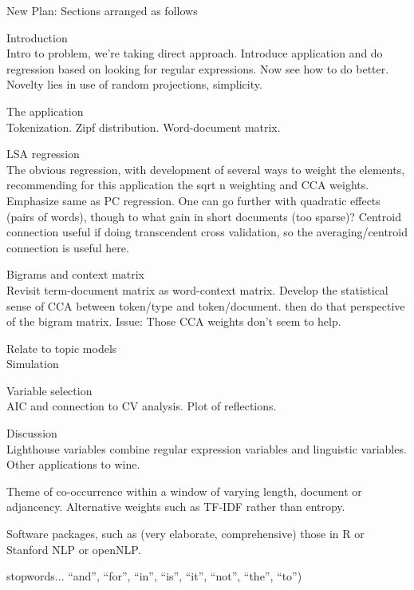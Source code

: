 \documentclass[12pt]{article}
\begin{document}
New Plan:
Sections arranged as follows
\begin{description}
\item{Introduction}  \\  
Intro to problem, we're taking direct approach.  Introduce application and do regression based on looking for   regular expressions.  Now see how to do better.  Novelty lies in use of random projections, simplicity.
\item{ The application } \\ Tokenization.  Zipf distribution.  Word-document matrix. 
\item{LSA regression}  \\ 
The obvious regression, with development of several ways to weight the elements, recommending for this application the sqrt n weighting and CCA weights.  Emphasize same as PC regression.  One can go further with quadratic effects (pairs of words), though to what gain in short documents (too sparse)?  Centroid connection useful if doing transcendent cross validation, so the averaging/centroid connection is useful here.
\item{Bigrams and context matrix} \\ 
Revisit term-document matrix as word-context matrix.  Develop the statistical sense of CCA between token/type and token/document.  then do that perspective of the bigram matrix.  Issue:  Those CCA weights don't seem to help.
\item{Relate to topic models} \\ 
Simulation
\item{Variable selection}  \\
 AIC and connection to CV analysis.  Plot of reflections.
\item{Discussion}  \\
Lighthouse variables combine regular expression variables and linguistic variables. Other applications to wine.
\end{description}



 Theme of co-occurrence within a window of varying length, document or
adjancency.  Alternative weights such as TF-IDF rather than entropy.

 Software packages, such as (very elaborate, comprehensive) those in R
 \citep[tm][]{feinerer08} or Stanford NLP or openNLP.

 stopwords... ``and'', ``for'', ``in'', ``is'', ``it'', ``not'', ``the'', ``to'')
 
 
\end{document}
